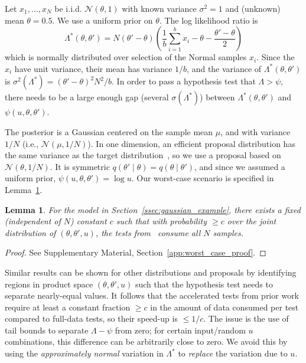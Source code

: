 \documentclass[twoside]{article} \usepackage{aistats2017}
\newtheorem{lemma}{Lemma}
\begin{document}
Let $x_1,\ldots,x_N$ be i.i.d. $\mathcal{N}(\theta,1)$ with known variance
$\sigma^2=1$ and (unknown) mean $\theta=0.5$. We use a uniform prior on
$\theta$. The log likelihood ratio is
\begin{equation}\label{eq:lemma_ll_ratio}
    \Lambda^*(\theta,\theta') = N(\theta'-\theta)\left(\frac{1}{b}\sum_{i=1}^b x_i-\theta-\frac{\theta'-\theta}{2}\right)
\end{equation}
which is normally distributed over selection of the Normal samples $x_i$.  Since
the $x_i$ have unit variance, their mean has variance $1/b$, and the variance of
$\Lambda^*(\theta,\theta')$ is $\sigma^2(\Lambda^*) = (\theta'-\theta)^2N^2/b$.
In order to pass a hypothesis test that $\Lambda > \psi$, there needs to be a
large enough gap (several $\sigma(\Lambda^*)$) between
$\Lambda^*(\theta,\theta')$ and $\psi(u,\theta,\theta')$. 

The posterior is a Gaussian centered on the sample mean $\mu$, and with variance
$1/N$ (i.e., $\mathcal{N}(\mu, 1/N)$). In one dimension, an efficient proposal
distribution has the same variance as the target
distribution~\citep{OptimalScaling01}, so we use a proposal based on
$\mathcal{N}(\theta,1/N)$. It is symmetric
$q(\theta'\mid\theta)=q(\theta\mid\theta')$, and since we assumed a uniform
prior, $\psi(u,\theta,\theta')=\log u$. Our worst-case scenario is specified in
Lemma~\ref{lem:worst_case}.

\begin{lemma}\label{lem:worst_case}
    For the model in Section~\ref{ssec:gaussian_example}, there exists a fixed
    (independent of $N$) constant $c$ such that with probability $\geq c$ over
    the joint distribution of $(\theta, \theta', u)$, the tests
    from~\cite{cutting_mh_2014,icml2014c1_bardenet14} consume all $N$ samples. 
\end{lemma}
\vspace{-1em}
\begin{proof}
See Supplementary Material, Section~\ref{app:worst_case_proof}.
\end{proof}
Similar results can be shown for other distributions and proposals by
identifying regions in product space $(\theta,\theta',u)$ such that the
hypothesis test needs to separate nearly-equal values.  It follows that the
accelerated tests from prior work require at least a constant fraction $\geq c$
in the amount of data consumed per test compared to full-data tests, so their
speed-up is $\le 1/c$. The issue is the use of tail bounds to separate $\Lambda-\psi$
from zero; for certain input/random $u$ combinations, this difference can be
arbitrarily close to zero. We avoid this by using the {\em approximately normal}
variation in $\Lambda^*$ to {\em replace} the variation due to $u$. 
\end{document}
